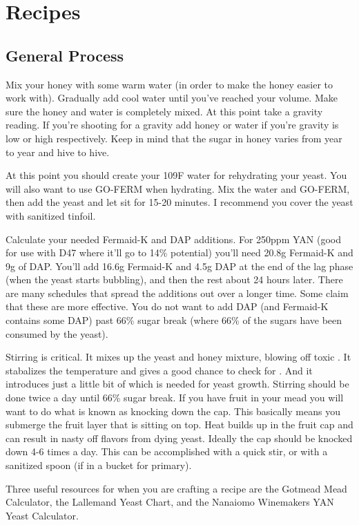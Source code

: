 \documentclass{article}
\begin{document}
{\section{Recipes}
 \subsection{General Process}
  Mix your honey with some warm water (in order to make the honey easier to work with). Gradually add cool water until you've reached your volume. 
  Make sure the honey and water is completely mixed. At this point take a gravity reading. If you're shooting for a gravity add honey or water if 
  you're gravity is low or high respectively. Keep in mind that the sugar in honey varies from year to year and hive to hive.

  At this point you should create your 109\textdegree F water for rehydrating your yeast. You will also want to use GO-FERM when hydrating. Mix the water and GO-FERM, then add the yeast and let sit for 15-20 minutes. I recommend you cover the yeast with sanitized tinfoil.

  Calculate your needed Fermaid-K and DAP additions. For 250ppm YAN (good for use with D47 where it'll go to 14\% potential) you'll need 20.8g Fermaid-K and 9g of DAP.
  You'll add 16.6g Fermaid-K and 4.5g DAP at the end of the lag phase (when the yeast starts bubbling), and then the rest about 24 hours later. 
  There are many schedules that spread the additions out over a longer time. Some claim that these are more effective. 
  You do not want to add DAP (and Fermaid-K contains some DAP) past 66\% sugar break (where 66\% of the sugars have been consumed by the yeast).

  Stirring is critical. It mixes up the yeast and honey mixture, blowing off toxic . 
  It stabalizes the temperature and gives a good chance to check for . And it introduces just a little bit of  which is needed for yeast growth.
  Stirring should be done twice a day until 66\% sugar break. If you have fruit in your mead you will want to do what is known as knocking down the cap.
  This basically means you submerge the fruit layer that is sitting on top. Heat builds up in the fruit cap and can result in nasty off flavors from dying yeast.
  Ideally the cap should be knocked down 4-6 times a day. This can be accomplished with a quick stir, or with a sanitized spoon (if in a bucket for primary).

  Three useful resources for when you are crafting a recipe are the Gotmead Mead Calculator\cite{gotmead-calculator},
  the Lallemand Yeast Chart\cite{lallemand-yeast},
  and the Nanaiomo Winemakers YAN Yeast Calculator\cite{nanaimo-calculator}.
  
}
\end{document}

